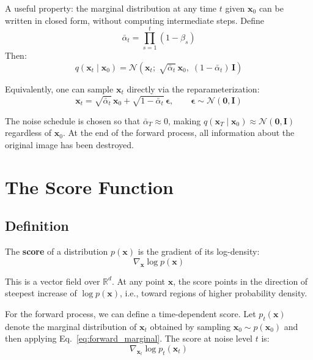\documentclass[11pt]{article}
\newcommand{\xb}{\mathbf{x}}
\newcommand{\eb}{\boldsymbol{\epsilon}}
\newcommand{\Ib}{\mathbf{I}}
\newcommand{\R}{\mathbb{R}}
\newcommand{\alphabar}{\bar{\alpha}}
\begin{document}
  A useful property: the marginal distribution at any time $t$ given $\xb_0$
  can be written in closed form, without computing intermediate steps. Define
  \begin{equation}
      \alphabar_t = \prod_{s=1}^{t} (1 - \beta_s)
  \end{equation}
  Then:
  \begin{equation}
      q(\xb_t \mid \xb_0) = \mathcal{N}\!\left(
          \xb_t;\; \sqrt{\alphabar_t}\, \xb_0,\;
          (1 - \alphabar_t)\, \Ib
      \right)
      \label{eq:forward_marginal}
  \end{equation}

  Equivalently, one can sample $\xb_t$ directly via the reparameterization:
  \begin{equation}
      \xb_t = \sqrt{\alphabar_t}\, \xb_0
          + \sqrt{1 - \alphabar_t}\, \eb,
      \qquad \eb \sim \mathcal{N}(\mathbf{0}, \Ib)
      \label{eq:reparam}
  \end{equation}

  The noise schedule is chosen so that $\alphabar_T \approx 0$, making
  $q(\xb_T \mid \xb_0) \approx \mathcal{N}(\mathbf{0}, \Ib)$
  regardless of $\xb_0$. At the end of the forward process, all information
  about the original image has been destroyed.

  \section{The Score Function}

  \subsection{Definition}

  The \textbf{score} of a distribution $p(\xb)$ is the gradient of its
  log-density:
  \begin{equation}
      \nabla_{\xb} \log p(\xb)
  \end{equation}

  This is a vector field over $\R^d$. At any point $\xb$, the score
  points in the direction of steepest increase of $\log p(\xb)$, i.e.,
  toward regions of higher probability density.

  For the forward process, we can define a time-dependent score. Let
  $p_t(\xb)$ denote the marginal distribution of $\xb_t$ obtained by
  sampling $\xb_0 \sim p(\xb_0)$ and then applying
  Eq.~\eqref{eq:forward_marginal}. The score at noise level $t$ is:
  \begin{equation}
      \nabla_{\xb_t} \log p_t(\xb_t)
  \end{equation}
\end{document}
